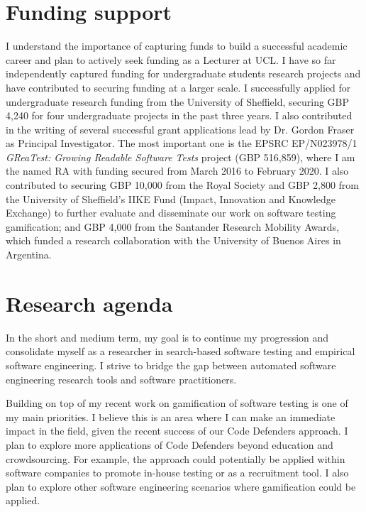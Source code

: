 \documentclass[a4paper]{article}
\begin{document}
\section{Funding support}

I understand the importance of capturing funds to build a successful
academic career and plan to actively seek funding as a Lecturer at
UCL. I have so far independently captured funding for undergraduate
students research projects and have contributed to securing funding at
a larger scale. I successfully applied for undergraduate research
funding from the University of Sheffield, securing GBP 4,240 for four
undergraduate projects in the past three years. I also contributed in
the writing of several successful grant applications lead by
Dr. Gordon Fraser as Principal Investigator. The most important one is
the EPSRC EP/N023978/1 \emph{GReaTest: Growing Readable Software
  Tests} project (GBP 516,859), where I am the named RA with funding
secured from March 2016 to February 2020. I also contributed to
securing GBP 10,000 from the Royal Society and GBP 2,800 from the
University of Sheffield's IIKE Fund (Impact, Innovation and Knowledge
Exchange) to further evaluate and disseminate our work on software
testing gamification; and GBP 4,000 from the Santander Research
Mobility Awards, which funded a research collaboration with the
University of Buenos Aires in Argentina.

\section{Research agenda}

In the short and medium term, my goal is to continue my progression
and consolidate myself as a researcher in search-based software
testing and empirical software engineering. I strive to bridge the gap
between automated software engineering research tools and software
practitioners.

Building on top of my recent work on gamification of software testing
is one of my main priorities. I believe this is an area where I can
make an immediate impact in the field, given the recent success of our
Code Defenders approach. I plan to explore more applications of Code
Defenders beyond education and crowdsourcing. For example, the
approach could potentially be applied within software companies to
promote in-house testing or as a recruitment tool. I also plan to
explore other software engineering scenarios where gamification could
be applied.
\end{document}
